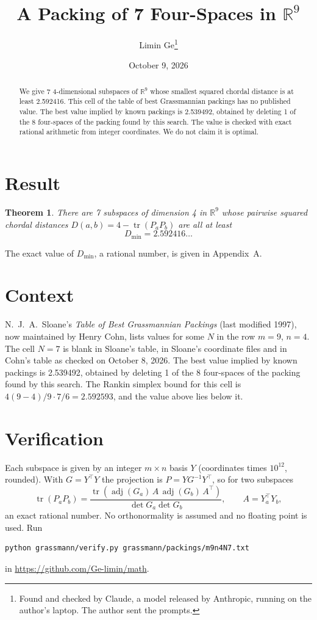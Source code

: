 \documentclass[11pt,a4paper]{article}
\title{A Packing of 7 Four-Spaces in $\mathbb{R}^{9}$}
\author{Limin Ge\thanks{Found and checked by Claude, a model released by Anthropic, running on the author's laptop. The author sent the prompts.}}
\date{October 9, 2026}
\newtheorem*{theorem}{Theorem}
\begin{document}
\maketitle
\begin{abstract}
We give 7 4-dimensional subspaces of $\mathbb{R}^{9}$ whose smallest squared chordal distance is at least 2.592416. This cell of the table of best Grassmannian packings has no published value. The best value implied by known packings is 2.539492, obtained by deleting 1 of the 8 four-spaces of the packing found by this search. The value is checked with exact rational arithmetic from integer coordinates. We do not claim it is optimal.
\end{abstract}

\section{Result}
\begin{theorem}
There are 7 subspaces of dimension 4 in $\mathbb{R}^{9}$ whose pairwise squared chordal distances $D(a,b) = 4 - \operatorname{tr}(P_aP_b)$ are all at least
\[ D_{\min} = 2.592416\ldots \]
\end{theorem}
The exact value of $D_{\min}$, a rational number, is given in Appendix~A.


\section{Context}
N.~J.~A.~Sloane's \emph{Table of Best Grassmannian Packings} (last modified 1997), now maintained by Henry Cohn, lists values for some $N$ in the row $m=9$, $n=4$. The cell $N=7$ is blank in Sloane's table, in Sloane's coordinate files and in Cohn's table as checked on October 8, 2026. The best value implied by known packings is 2.539492, obtained by deleting 1 of the 8 four-spaces of the packing found by this search. The Rankin simplex bound for this cell is $4(9-4)/9\cdot 7/6 = 2.592593$, and the value above lies below it.


\section{Verification}
Each subspace is given by an integer $m\times n$ basis $Y$ (coordinates times $10^{12}$, rounded). With $G=Y^\top Y$ the projection is $P=YG^{-1}Y^\top$, so for two subspaces
\[ \operatorname{tr}(P_aP_b)=\frac{\operatorname{tr}(\operatorname{adj}(G_a)\,A\,\operatorname{adj}(G_b)\,A^\top)}{\det G_a\det G_b},\qquad A=Y_a^\top Y_b, \]
an exact rational number. No orthonormality is assumed and no floating point is used. Run
\begin{verbatim}
python grassmann/verify.py grassmann/packings/m9n4N7.txt
\end{verbatim}
in \url{https://github.com/Ge-limin/math}.
\end{document}
